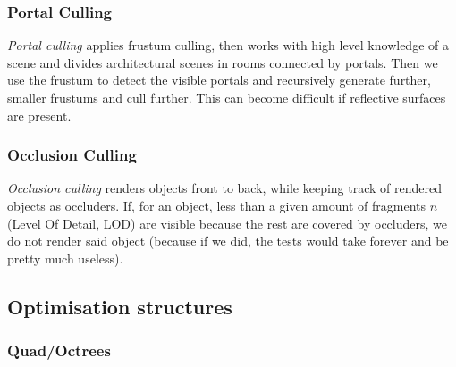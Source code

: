 \documentclass{panikzettel}
\begin{document}
\subsubsection*{Portal Culling}

\emph{Portal culling} applies frustum culling, then works with high level knowledge of a scene and divides architectural scenes in rooms connected by portals. Then we use the frustum to detect the visible portals and recursively generate further, smaller frustums and cull further. This can become difficult if reflective surfaces are present.

\subsubsection*{Occlusion Culling}

\emph{Occlusion culling} renders objects front to back, while keeping track of rendered objects as occluders. If, for an object, less than a given amount of fragments $n$ (Level Of Detail, LOD) are visible because the rest are covered by occluders, we do not render said object (because if we did, the tests would take forever and be pretty much useless).

\subsection{Optimisation structures}

\subsubsection*{Quad/Octrees}
\end{document}
